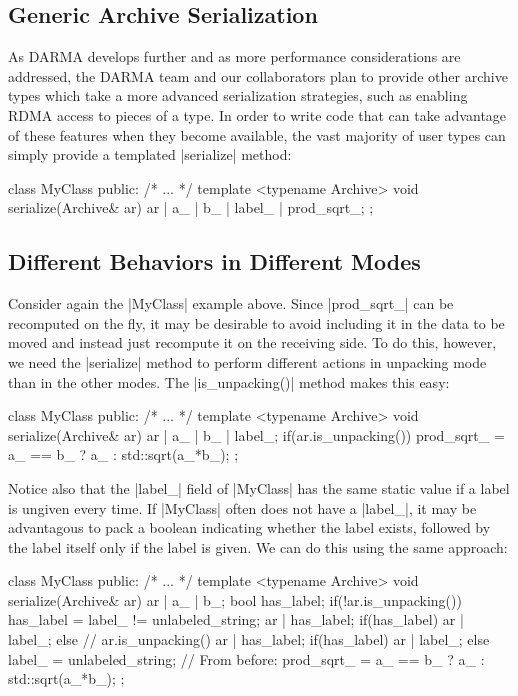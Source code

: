 \subsection{Generic Archive Serialization}

As DARMA develops further and as more performance considerations are addressed,
the DARMA team and our collaborators plan to provide other archive types which
take a more advanced serialization strategies, such as enabling \gls{RDMA}
access to pieces of a type.  In order to write code that can take advantage of
these features when they become available, the vast majority of user types can
simply provide a templated |serialize| method:
\begin{CppCodeNumb}
class MyClass {
  public:
    /* ... */
    template <typename Archive>
    void serialize(Archive& ar) {
      ar | a_ | b_ | label_ | prod_sqrt_;
    }
};
\end{CppCodeNumb}

\subsection{Different Behaviors in Different Modes}

Consider again the |MyClass| example above.  Since |prod_sqrt_| can be
recomputed on the fly, it may be desirable to avoid including it in the data to
be moved and instead just recompute it on the receiving side.  To do this, however,
we need the |serialize| method to perform different actions in unpacking mode
than in the other modes.  The |is_unpacking()| method makes this easy:
%
\begin{CppCodeNumb}
class MyClass {
  public:
    /* ... */
    template <typename Archive>
    void serialize(Archive& ar) {
      ar | a_ | b_ | label_;
      if(ar.is_unpacking())
        prod_sqrt_ = a_ == b_ ? a_ : std::sqrt(a_*b_);
    }
};
\end{CppCodeNumb}
%
Notice also that the |label_| field of |MyClass| has the same static value if a
label is ungiven every time.  If |MyClass| often does not have a |label_|, it
may be advantagous to pack a boolean indicating whether the label exists,
followed by the label itself only if the label is given.  We can do this using
the same approach:
\begin{CppCodeNumb}
class MyClass {
  public:
    /* ... */
    template <typename Archive>
    void serialize(Archive& ar) {
      ar | a_ | b_;
      bool has_label;
      if(!ar.is_unpacking()) {
        has_label = label_ != unlabeled_string;
        ar | has_label;
        if(has_label) ar | label_;
      }
      else { // ar.is_unpacking()
        ar | has_label;
        if(has_label) ar | label_;
        else label_ = unlabeled_string;    
        // From before:
        prod_sqrt_ = a_ == b_ ? a_ : std::sqrt(a_*b_);
      }
    }
};
\end{CppCodeNumb}

